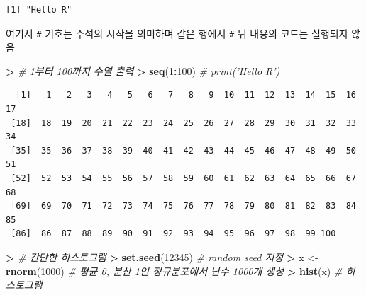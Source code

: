 \documentclass[11pt,a4paper]{book}
\newenvironment{Shaded}{\begin{snugshade}}{\end{snugshade}}
\newcommand{\KeywordTok}[1]{\textcolor[rgb]{0.13,0.29,0.53}{\textbf{#1}}}
\newcommand{\DecValTok}[1]{\textcolor[rgb]{0.00,0.00,0.81}{#1}}
\newcommand{\StringTok}[1]{\textcolor[rgb]{0.31,0.60,0.02}{#1}}
\newcommand{\CommentTok}[1]{\textcolor[rgb]{0.56,0.35,0.01}{\textit{#1}}}
\newcommand{\OperatorTok}[1]{\textcolor[rgb]{0.81,0.36,0.00}{\textbf{#1}}}
\newcommand{\ErrorTok}[1]{\textcolor[rgb]{0.64,0.00,0.00}{\textbf{#1}}}
\newcommand{\NormalTok}[1]{#1}
\theoremstyle{definition}
\theoremstyle{definition}
\theoremstyle{definition}
\theoremstyle{remark}
\begin{document}
\begin{verbatim}
[1] "Hello R"
\end{verbatim}

\normalsize

여기서 \texttt{\#} 기호는 주석의 시작을 의미하며 같은 행에서 \texttt{\#}
뒤 내용의 코드는 실행되지 않음

\footnotesize

\begin{Shaded}
\begin{Highlighting}[]
\OperatorTok{>}\StringTok{ }\CommentTok{# 1부터 100까지 수열 출력}
\ErrorTok{>}\StringTok{ }\KeywordTok{seq}\NormalTok{(}\DecValTok{1}\OperatorTok{:}\DecValTok{100}\NormalTok{)  }\CommentTok{# print('Hello R')}
\end{Highlighting}
\end{Shaded}

\begin{verbatim}
  [1]   1   2   3   4   5   6   7   8   9  10  11  12  13  14  15  16  17
 [18]  18  19  20  21  22  23  24  25  26  27  28  29  30  31  32  33  34
 [35]  35  36  37  38  39  40  41  42  43  44  45  46  47  48  49  50  51
 [52]  52  53  54  55  56  57  58  59  60  61  62  63  64  65  66  67  68
 [69]  69  70  71  72  73  74  75  76  77  78  79  80  81  82  83  84  85
 [86]  86  87  88  89  90  91  92  93  94  95  96  97  98  99 100
\end{verbatim}

\normalsize

\footnotesize

\begin{Shaded}
\begin{Highlighting}[]
\OperatorTok{>}\StringTok{ }\CommentTok{# 간단한 히스토그램}
\ErrorTok{>}\StringTok{ }\KeywordTok{set.seed}\NormalTok{(}\DecValTok{12345}\NormalTok{)  }\CommentTok{# random seed 지정}
\OperatorTok{>}\StringTok{ }\NormalTok{x <-}\StringTok{ }\KeywordTok{rnorm}\NormalTok{(}\DecValTok{1000}\NormalTok{)  }\CommentTok{# 평균 0, 분산 1인 정규분포에서 난수 1000개 생성}
\OperatorTok{>}\StringTok{ }\KeywordTok{hist}\NormalTok{(x)  }\CommentTok{# 히스토그램}
\end{Highlighting}
\end{Shaded}
\end{document}
